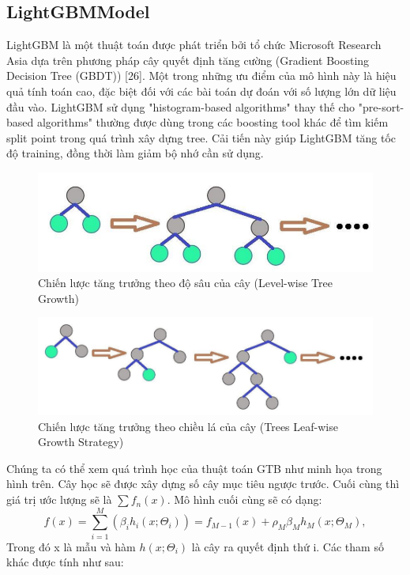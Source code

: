 \documentclass[conference]{IEEEtran}
\begin{document}
\subsection{LightGBMModel}
LightGBM là một thuật toán được phát triển bởi tổ chức Microsoft Research Asia dựa trên phương pháp cây quyết định tăng cường (Gradient Boosting Decision Tree (GBDT)) [26]. Một trong những ưu điểm của mô hình này là hiệu quả tính toán cao, đặc biệt đối với các bài toán dự đoán với số lượng lớn dữ liệu đầu vào. LightGBM sử dụng "histogram-based algorithms" thay thế cho "pre-sort-based algorithms" thường được dùng trong các boosting tool khác để tìm kiếm split point trong quá trình xây dựng tree. Cải tiến này giúp LightGBM tăng tốc độ training, đồng thời làm giảm bộ nhớ cần sử dụng. 
\begin{figure}[H]
    \centering
    \begin{minipage}{0.5\textwidth}
    \centering
    \includegraphics[width=1\textwidth]{Image/Level-wise Tree Growth.png}
    \caption{Chiến lược tăng trưởng theo độ sâu của cây (Level-wise Tree Growth)}
    \label{fig:1}
    \end{minipage}
\end{figure}
\begin{figure}[H]
    \centering
    \begin{minipage}{0.5\textwidth}
    \centering
    \includegraphics[width=1\textwidth]{Image/Trees Leaf-wise Growth Strategy.png}
    \caption{Chiến lược tăng trưởng theo chiều lá của cây (Trees Leaf-wise Growth Strategy)}
    \label{fig:1}
    \end{minipage}
\end{figure}
Chúng ta có thể xem quá trình học của thuật toán GTB như minh họa trong hình trên. Cây học sẽ được xây dựng số cây mục tiêu ngược trước. Cuối cùng thì giá trị ước lượng sẽ là $\sum f_n(x)$. Mô hình cuối cùng sẽ có dạng:
$$
f(x) = \sum_{i=1}^{M} (\beta_i h_i (x; \Theta_i)) = f_{M-1}(x) + \rho_M \beta_M h_M (x; \Theta_M),
$$
Trong đó x là mẫu và hàm $h(x; \Theta_i)$ là cây ra quyết định thứ i. Các tham số khác được tính như sau:
\end{document}
